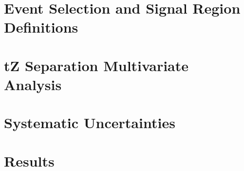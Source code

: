 \documentclass[12pt]{report}	%
\theoremstyle{definition}
\theoremstyle{remark}
\begin{document}
%
 
\section{Event Selection and Signal Region Definitions}
\label{sec:evt_selection}

 
\section{tZ Separation Multivariate Analysis}
\label{sec:tZ_bdt}


\section{Systematic Uncertainties}
\label{sec:sys}
                                                                              
                                                                                                                             
\section{Results}
\label{sec:results}                                                                                                          

\end{document}
